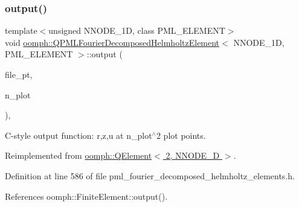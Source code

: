 \subsubsection{\texorpdfstring{output()}{output()}\hspace{0.1cm}{\footnotesize\ttfamily [4/4]}}
{\footnotesize\ttfamily template$<$unsigned N\+N\+O\+D\+E\+\_\+1D, class P\+M\+L\+\_\+\+E\+L\+E\+M\+E\+NT$>$ \\
void \hyperlink{classoomph_1_1QPMLFourierDecomposedHelmholtzElement}{oomph\+::\+Q\+P\+M\+L\+Fourier\+Decomposed\+Helmholtz\+Element}$<$ N\+N\+O\+D\+E\+\_\+1D, P\+M\+L\+\_\+\+E\+L\+E\+M\+E\+NT $>$\+::output (\begin{DoxyParamCaption}\item[{F\+I\+LE $\ast$}]{file\+\_\+pt,  }\item[{const unsigned \&}]{n\+\_\+plot }\end{DoxyParamCaption})\hspace{0.3cm}{\ttfamily [inline]}, {\ttfamily [virtual]}}



C-\/style output function\+: r,z,u at n\+\_\+plot$^\wedge$2 plot points. 



Reimplemented from \hyperlink{classoomph_1_1QElement_3_012_00_01NNODE__1D_01_4_aeaa407209398e3c0daf6968520d774ec}{oomph\+::\+Q\+Element$<$ 2, N\+N\+O\+D\+E\+\_\+D $>$}.



Definition at line 586 of file pml\+\_\+fourier\+\_\+decomposed\+\_\+helmholtz\+\_\+elements.\+h.



References oomph\+::\+Finite\+Element\+::output().

\mbox{\label{classoomph_1_1QPMLFourierDecomposedHelmholtzElement_a502b29e718eed748e36e28a5b5a229f0}} 
